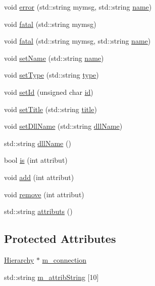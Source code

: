 \begin{DoxyCompactItemize}
void \hyperlink{classObject_ad7f6c457733082efa2f9ff5f5c8e119a}{error} (std\+::string mymsg, std\+::string \hyperlink{classObject_a300f4c05dd468c7bb8b3c968868443c1}{name})
\item 
void \hyperlink{classObject_aad5a16aac7516ce65bd5ec02ab07fc80}{fatal} (std\+::string mymsg)
\item 
void \hyperlink{classObject_ae62acd3d09f716220f75f252dc38bc9a}{fatal} (std\+::string mymsg, std\+::string \hyperlink{classObject_a300f4c05dd468c7bb8b3c968868443c1}{name})
\item 
void \hyperlink{classObject_ae30fea75683c2d149b6b6d17c09ecd0c}{set\+Name} (std\+::string \hyperlink{classObject_a300f4c05dd468c7bb8b3c968868443c1}{name})
\item 
void \hyperlink{classObject_aae534cc9d982bcb9b99fd505f2e103a5}{set\+Type} (std\+::string \hyperlink{classObject_a84f99f70f144a83e1582d1d0f84e4e62}{type})
\item 
void \hyperlink{classObject_a398fe08cba594a0ce6891d59fe4f159f}{set\+Id} (unsigned char \hyperlink{classObject_af99145335cc61ff6e2798ea17db009d2}{id})
\item 
void \hyperlink{classObject_a89557dbbad5bcaa02652f5d7fa35d20f}{set\+Title} (std\+::string \hyperlink{classObject_a73a0f1a41828fdd8303dd662446fb6c3}{title})
\item 
void \hyperlink{classObject_a870c5af919958c2136623b2d7816d123}{set\+Dll\+Name} (std\+::string \hyperlink{classObject_a2e3947f2870094c332d7454117f3ec63}{dll\+Name})
\item 
std\+::string \hyperlink{classObject_a2e3947f2870094c332d7454117f3ec63}{dll\+Name} ()
\item 
bool \hyperlink{classAttrib_a704f26af560909ad22065083bb7d4c34}{is} (int attribut)
\item 
void \hyperlink{classAttrib_a235f773af19c900264a190b00a3b4ad7}{add} (int attribut)
\item 
void \hyperlink{classAttrib_a7d4ef7e32d93cb287792b87b857e79f3}{remove} (int attribut)
\item 
std\+::string \hyperlink{classAttrib_aee7bbf16b144887f196e1341b24f8a26}{attributs} ()
\end{DoxyCompactItemize}
\subsection*{Protected Attributes}
\begin{DoxyCompactItemize}
\item 
\hyperlink{classHierarchy}{Hierarchy} $\ast$ \hyperlink{classElement_abe3de7a5dbbc9a6dd2d7e012e5fdb266}{m\+\_\+connection}
\item 
std\+::string \hyperlink{classAttrib_a3414521d7a82476e874b25a5407b5e63}{m\+\_\+attrib\+String} \mbox{[}10\mbox{]}
\end{DoxyCompactItemize}
